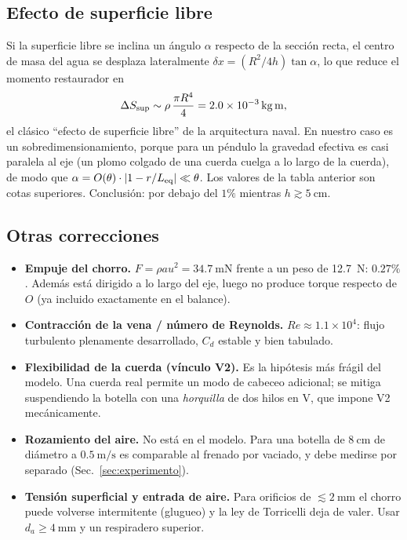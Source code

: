 \documentclass[11pt,a4paper]{article}
\begin{document}
\subsection{Efecto de superficie libre}

Si la superficie libre se inclina un ángulo $\alpha$ respecto de la sección recta, el centro de
masa del agua se desplaza lateralmente $\delta x = (R^2/4h)\tan\alpha$, lo que reduce el momento
restaurador en
\begin{equation}
\Delta S_{\rm sup} \sim \rho\,\frac{\pi R^4}{4} = \SI{2.0e-3}{\kilo\gram\meter},
\end{equation}
el clásico ``efecto de superficie libre'' de la arquitectura naval. En nuestro caso es un
sobredimensionamiento, porque para un péndulo la gravedad efectiva es casi paralela al eje
(un plomo colgado de una cuerda cuelga a lo largo de la cuerda), de modo que $\alpha=O(\theta)\cdot
|1-r/L_{\rm eq}|\ll\theta$. Los valores de la tabla anterior son cotas superiores. Conclusión: por
debajo del $1\%$ mientras $h\gtrsim\SI{5}{\centi\meter}$.

\subsection{Otras correcciones}

\begin{itemize}[leftmargin=*,itemsep=2pt]
\item \textbf{Empuje del chorro.} $F = \rho a u^2 = \SI{34.7}{\milli\newton}$ frente a un peso de
\SI{12.7}{\newton}: $0.27\%$. Además está dirigido a lo largo del eje, luego no produce torque
respecto de $O$ (ya incluido exactamente en el balance).
\item \textbf{Contracción de la vena / número de Reynolds.} $Re\approx 1.1\times10^4$: flujo
turbulento plenamente desarrollado, $C_d$ estable y bien tabulado.
\item \textbf{Flexibilidad de la cuerda (vínculo V2).} Es la hipótesis más frágil del modelo. Una
cuerda real permite un modo de cabeceo adicional; se mitiga suspendiendo la botella con una
\emph{horquilla} de dos hilos en V, que impone V2 mecánicamente.
\item \textbf{Rozamiento del aire.} No está en el modelo. Para una botella de $\SI{8}{\centi\meter}$
de diámetro a $\SI{0.5}{\meter\per\second}$ es comparable al frenado por vaciado, y debe medirse
por separado (Sec.~\ref{sec:experimento}).
\item \textbf{Tensión superficial y entrada de aire.} Para orificios de $\lesssim\SI{2}{\milli\meter}$
el chorro puede volverse intermitente (glugueo) y la ley de Torricelli deja de valer.
Usar $d_a\ge\SI{4}{\milli\meter}$ y un respiradero superior.
\end{itemize}
\end{document}
